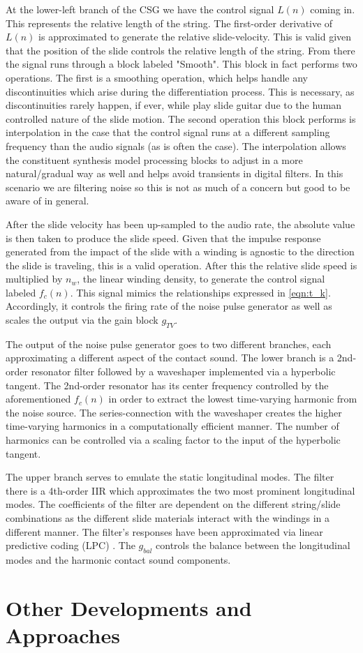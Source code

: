 \documentclass[main.tex]{subfiles}
\begin{document}
At the lower-left branch of the CSG we have the control signal $L(n)$ coming in. This represents the relative length of the string. The first-order derivative of $L(n)$ is approximated to generate the relative slide-velocity. This is valid given that the position of the slide controls the relative length of the string. From there the signal runs through a block labeled "Smooth". This block in fact performs two operations. The first is a smoothing operation, which helps handle any discontinuities which arise during the differentiation process. This is necessary, as discontinuities rarely happen, if ever, while play slide guitar due to the human controlled nature of the slide motion. The second operation this block performs is interpolation in the case that the control signal runs at a different sampling frequency than the audio signals (as is often the case). The interpolation allows the constituent synthesis model processing blocks to adjust in a more natural/gradual way as well and helps avoid transients in digital filters. In this scenario we are filtering noise so this is not as much of a concern but good to be aware of in general.

After the slide velocity has been up-sampled to the audio rate, the absolute value is then taken to produce the slide speed. Given that the impulse response generated from the impact of the slide with a winding is agnostic to the direction the slide is traveling, this is a valid operation. After this the relative slide speed is multiplied by $n_w$, the linear winding density, to generate the control signal labeled $f_c(n)$. This signal mimics the relationships expressed in \ref{eqn:t_k}. Accordingly, it controls the firing rate of the noise pulse generator as well as scales the output via the gain block $g_{TV}$.

The output of the noise pulse generator goes to two different branches, each approximating a different aspect of the contact sound. The lower branch is a 2nd-order resonator filter followed by a waveshaper implemented via a hyperbolic tangent. The 2nd-order resonator has its center frequency controlled by the aforementioned $f_c(n)$ in order to extract the lowest time-varying harmonic from the noise source. The series-connection with the waveshaper creates the higher time-varying harmonics in a computationally efficient manner. The number of harmonics can be controlled via a scaling factor to the input of the hyperbolic tangent.

The upper branch serves to emulate the static longitudinal modes. The filter there is a 4th-order IIR which approximates the two most prominent longitudinal modes. The coefficients of the filter are dependent on the different string/slide combinations as the different slide materials interact with the windings in a different manner. The filter's responses have been approximated via linear predictive coding (LPC) . The $g_{bal}$ controls the balance between the longitudinal modes and the harmonic contact sound components.

\section{Other Developments and Approaches}
\end{document}
